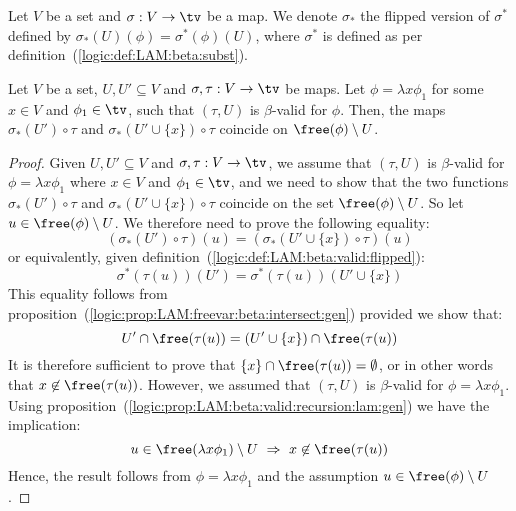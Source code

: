 \begin{defin}\label{logic:def:LAM:beta:valid:flipped}
    Let $V$ be a set and $\sigma:V\to\tv$ be a map. We denote $\sigma_{*}$ 
    the flipped version of $\sigma^{*}$ defined by $\sigma_{*}(U)(\phi)
    =\sigma^{*}(\phi)(U)$, where $\sigma^{*}$ is defined as per 
    definition~(\ref{logic:def:LAM:beta:subst}).
\end{defin}


\begin{lemma}\label{logic:prop:LAM:beta:valid:technical:lemma:1}
    Let $V$ be a set, $U,U'\subseteq V$ and $\sigma,\tau:V\to\tv$ be maps.
    Let $\phi=\lambda x\phi_{1}$ for some $x\in V$ and $\phi_{1}\in\tv$, 
    such that $(\tau,U)$ is $\beta$-valid for $\phi$. Then, the maps 
    $\sigma_{*}(U')\circ\tau$ and $\sigma_{*}(U'\cup\{x\})\circ\tau$ 
    coincide on $\free(\phi)\setminus U$.
\end{lemma}
\begin{proof}
    Given $U,U'\subseteq V$ and $\sigma,\tau:V\to\tv$, we assume that
    $(\tau,U)$ is $\beta$-valid for $\phi=\lambda x\phi_{1}$ where 
    $x\in V$ and $\phi_{1}\in\tv$, and we need to show that the two 
    functions $\sigma_{*}(U')\circ\tau$ and $\sigma_{*}(U'\cup\{x\})\circ
    \tau$ coincide on the set $\free(\phi)\setminus U$. So let $u\in\free(
    \phi)\setminus U$. We therefore need to prove the following equality:
        \[
            (\sigma_{*}(U')\circ\tau)(u) 
            =
            (\sigma_{*}(U'\cup\{x\})\circ\tau)(u) 
        \]
    or equivalently, given definition~(\ref{logic:def:LAM:beta:valid:flipped}):
        \[
            \sigma^{*}(\tau(u))(U')
            =
            \sigma^{*}(\tau(u))(U'\cup\{x\})
        \]
    This equality follows from
    proposition~(\ref{logic:prop:LAM:freevar:beta:intersect:gen}) provided
    we show that:
        \[
            U' \cap\free(\tau(u)) = (U'\cup\{x\})\cap\free(\tau(u))
        \]
    It is therefore sufficient to prove that $\{x\}\cap\free(\tau(u))=
    \emptyset$, or in other words that $x\not\in\free(\tau(u))$. However, 
    we assumed that $(\tau,U)$ is $\beta$-valid for $\phi=\lambda x\phi_{1}$. 
    Using proposition~(\ref{logic:prop:LAM:beta:valid:recursion:lam:gen})
    we have the implication:
        \[
            u\in\free(\lambda x\phi_{1})\setminus U\ 
            \Rightarrow\ 
            x\not\in\free(\tau(u))
        \]
    Hence, the result follows from $\phi=\lambda x\phi_{1}$ and the assumption  
    $u\in\free(\phi)\setminus U$.
\end{proof}

